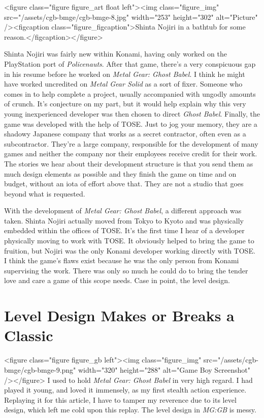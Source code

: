 \documentclass{book}
\begin{document}
<figure class="figure figure_art float left"><img class="figure_img" src="/assets/cgb-bmge/cgb-bmge-8.jpg" width="253" height="302" alt="Picture" /><figcaption class="figure_figcaption">Shinta Nojiri in a bathtub for some reason.</figcaption></figure>

Shinta Nojiri was fairly new within Konami, having only worked on the PlayStation port of \emph{Policenauts}. After that game, there’s a very conspicuous gap in his resume before he worked on \emph{Metal Gear: Ghost Babel}. I think he might have worked uncredited on \emph{Metal Gear Solid} as a sort of fixer. Someone who comes in to help complete a project, usually accompanied with ungodly amounts of crunch. It’s conjecture on my part, but it would help explain why this very young inexperienced developer was then chosen to direct \emph{Ghost Babel}. Finally, the game was developed with the help of TOSE. Just to jog your memory, they are a shadowy Japanese company that works as a secret contractor, often even as a subcontractor. They’re a large company, responsible for the development of many games and neither the company nor their employees receive credit for their work. The stories we hear about their development structure is that you send them as much design elements as possible and they finish the game on time and on budget, without an iota of effort above that. They are not a studio that goes beyond what is requested.

With the development of \emph{Metal Gear: Ghost Babel}, a different approach was taken. Shinta Nojiri actually moved from Tokyo to Kyoto and was physically embedded within the offices of TOSE. It’s the first time I hear of a developer physically moving to work with TOSE. It obviously helped to bring the game to fruition, but Nojiri was the only Konami developer working directly with TOSE. I think the game’s flaws exist because he was the only person from Konami supervising the work. There was only so much he could do to bring the tender love and care a game of this scope needs. Case in point, the level design.

\FloatBarrier\needspace{10mm}\section*{Level Design Makes or Breaks a Classic}\nopagebreak[4]

<figure class="figure figure_gb left"><img class="figure_img" src="/assets/cgb-bmge/cgb-bmge-9.png" width="320" height="288" alt="Game Boy Screenshot" /></figure>
I used to hold \emph{Metal Gear: Ghost Babel} in very high regard. I had played it young, and loved it immensely, as my first stealth action experience. Replaying it for this article, I have to tamper my reverence due to its level design, which left me cold upon this replay. The level design in \emph{MG:GB} is messy.
\end{document}
